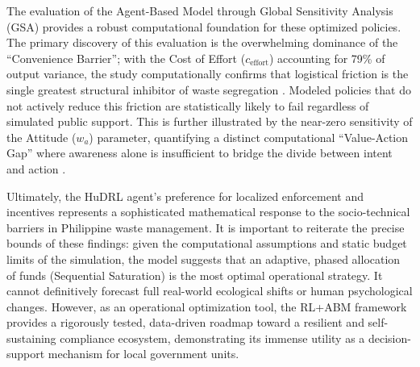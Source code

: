 The evaluation of the Agent-Based Model through Global Sensitivity Analysis (GSA) provides a robust computational foundation for these optimized policies. The primary discovery of this evaluation is the overwhelming dominance of the ``Convenience Barrier''; with the Cost of Effort ($c_{\text{effort}}$) accounting for 79\% of output variance, the study computationally confirms that logistical friction is the single greatest structural inhibitor of waste segregation \citep{Yazawa2025}. Modeled policies that do not actively reduce this friction are statistically likely to fail regardless of simulated public support. This is further illustrated by the near-zero sensitivity of the Attitude ($w_a$) parameter, quantifying a distinct computational ``Value-Action Gap'' where awareness alone is insufficient to bridge the divide between intent and action \citep{Zhao2022}.

Ultimately, the HuDRL agent’s preference for localized enforcement and incentives represents a sophisticated mathematical response to the socio-technical barriers in Philippine waste management. It is important to reiterate the precise bounds of these findings: given the computational assumptions and static budget limits of the simulation, the model suggests that an adaptive, phased allocation of funds (Sequential Saturation) is the most optimal operational strategy. It cannot definitively forecast full real-world ecological shifts or human psychological changes. However, as an operational optimization tool, the RL+ABM framework provides a rigorously tested, data-driven roadmap toward a resilient and self-sustaining compliance ecosystem, demonstrating its immense utility as a decision-support mechanism for local government units.
